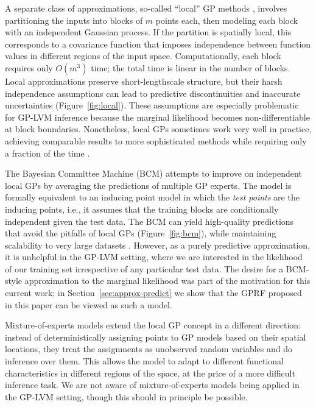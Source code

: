 \documentclass{article}
\begin{document}
A separate class of approximations, so-called ``local'' GP methods
\cite{rasmussen2006, nguyen2009model, zhao2011human, park2011domain}, involves
partitioning the inputs into blocks of $m$ points each, then modeling
each block with an independent Gaussian process. If the partition is
spatially local, this corresponds to a covariance function that imposes independence
between function values in different regions of the input
space. Computationally, each block requires only $O(m^3)$ time; the
total time is linear in the number of blocks. Local approximations
preserve short-lengthscale structure, but their harsh independence assumptions can lead to
predictive discontinuities and inaccurate uncertainties
(Figure~\ref{fig:local}). These assumptions are especially problematic for
GP-LVM inference because the marginal likelihood becomes
non-differentiable at block boundaries. Nonetheless, local GPs sometimes
work very well in practice, achieving comparable results to more
sophisticated methods while requiring only a fraction of the time \cite{chalupka2012}.

The Bayesian Committee Machine (BCM) \cite{tresp2000bayesian} attempts
to improve on independent local GPs by averaging the predictions of
multiple GP experts. The model is formally equivalent to an inducing
point model in which the {\em test points} are the inducing points,
i.e., it assumes that the training blocks are conditionally
independent given the test data. The BCM can yield high-quality
predictions that avoid the pitfalls of local GPs
(Figure~\ref{fig:bcm}), while
maintaining scalability to very large datasets
\cite{deisenroth2015distributed}. However, as a purely predictive
approximation, it is unhelpful in the GP-LVM setting, where we are
interested in the likelihood of our training set irrespective of any
particular test data.  The desire for a BCM-style approximation to the
marginal likelihood was part of the motivation for this current work;
in Section~\ref{sec:approx-predict} we show that the GPRF proposed in this
paper can be viewed as such a model.

Mixture-of-experts models \cite{rasmussen2002infinite, nguyen2014fast}
extend the local GP concept in a different direction: instead of
deterministically assigning points to GP models based on their spatial
locations, they treat the assignments as unobserved random variables
and do inference over them. This allows the model to adapt to different
functional characteristics in different regions of the space, at the
price of a more difficult inference task. We are not aware of
mixture-of-experts models being applied in the GP-LVM setting, though
this should in principle be possible.
\end{document}

